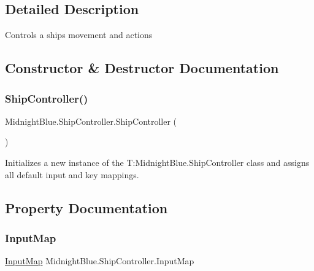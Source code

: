 \subsection{Detailed Description}
Controls a ships movement and actions 



\subsection{Constructor \& Destructor Documentation}
\hypertarget{class_midnight_blue_1_1_ship_controller_a07d38d2b98b9b132f1eff9cc8879f278}{}\label{class_midnight_blue_1_1_ship_controller_a07d38d2b98b9b132f1eff9cc8879f278} 
\subsubsection{\texorpdfstring{Ship\+Controller()}{ShipController()}}
{\footnotesize\ttfamily Midnight\+Blue.\+Ship\+Controller.\+Ship\+Controller (\begin{DoxyParamCaption}{ }\end{DoxyParamCaption})\hspace{0.3cm}{\ttfamily [inline]}}



Initializes a new instance of the T\+:\+Midnight\+Blue.\+Ship\+Controller class and assigns all default input and key mappings. 



\subsection{Property Documentation}
\hypertarget{class_midnight_blue_1_1_ship_controller_a50136c59b5a0e80d280aec4b6de46414}{}\label{class_midnight_blue_1_1_ship_controller_a50136c59b5a0e80d280aec4b6de46414} 
\subsubsection{\texorpdfstring{Input\+Map}{InputMap}}
{\footnotesize\ttfamily \hyperlink{class_midnight_blue_1_1_engine_1_1_i_o_1_1_input_map}{Input\+Map} Midnight\+Blue.\+Ship\+Controller.\+Input\+Map\hspace{0.3cm}{\ttfamily [get]}}



